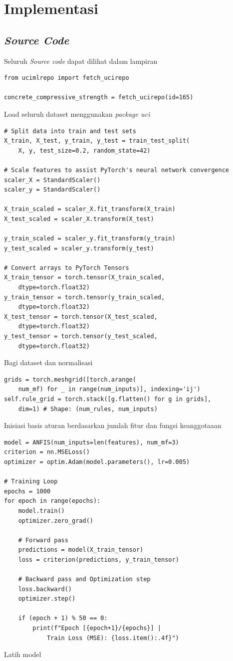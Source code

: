 \section{Implementasi}
\subsection{\textit{Source Code}}
Seluruh \textit{Source code} dapat dilihat dalam lampiran

\begin{verbatim}
from ucimlrepo import fetch_ucirepo 

concrete_compressive_strength = fetch_ucirepo(id=165) 
\end{verbatim}
Load seluruh dataset menggunakan \textit{package uci}

\begin{verbatim}
# Split data into train and test sets
X_train, X_test, y_train, y_test = train_test_split(
    X, y, test_size=0.2, random_state=42)

# Scale features to assist PyTorch's neural network convergence
scaler_X = StandardScaler()
scaler_y = StandardScaler()

X_train_scaled = scaler_X.fit_transform(X_train)
X_test_scaled = scaler_X.transform(X_test)

y_train_scaled = scaler_y.fit_transform(y_train)
y_test_scaled = scaler_y.transform(y_test)

# Convert arrays to PyTorch Tensors
X_train_tensor = torch.tensor(X_train_scaled, 
    dtype=torch.float32)
y_train_tensor = torch.tensor(y_train_scaled, 
    dtype=torch.float32)
X_test_tensor = torch.tensor(X_test_scaled,
    dtype=torch.float32)
y_test_tensor = torch.tensor(y_test_scaled, 
    dtype=torch.float32)
\end{verbatim}
Bagi dataset dan normalisasi 

\begin{verbatim}
grids = torch.meshgrid([torch.arange(
    num_mf) for _ in range(num_inputs)], indexing='ij')
self.rule_grid = torch.stack([g.flatten() for g in grids], 
    dim=1) # Shape: (num_rules, num_inputs)
\end{verbatim}
Inisiasi basis aturan berdasarkan jumlah fitur dan fungsi keanggotaaan

\begin{verbatim}
model = ANFIS(num_inputs=len(features), num_mf=3)
criterion = nn.MSELoss()
optimizer = optim.Adam(model.parameters(), lr=0.005)

# Training Loop
epochs = 1000
for epoch in range(epochs):
    model.train()
    optimizer.zero_grad()
    
    # Forward pass
    predictions = model(X_train_tensor)
    loss = criterion(predictions, y_train_tensor)
    
    # Backward pass and Optimization step
    loss.backward()
    optimizer.step()
    
    if (epoch + 1) % 50 == 0:
        print(f"Epoch [{epoch+1}/{epochs}] | 
            Train Loss (MSE): {loss.item():.4f}")
\end{verbatim}
Latih model

